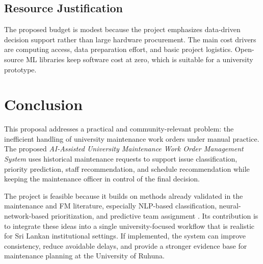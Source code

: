 \documentclass[11pt,a4paper]{report}
\begin{document}
\subsection{Resource Justification}
The proposed budget is modest because the project emphasizes data-driven decision support rather than large hardware procurement. The main cost drivers are computing access, data preparation effort, and basic project logistics. Open-source \ac{ML} libraries keep software cost at zero, which is suitable for a university prototype.

\section{Conclusion}
This proposal addresses a practical and community-relevant problem: the inefficient handling of university maintenance work orders under manual practice. The proposed \textit{AI-Assisted University Maintenance Work Order Management System} uses historical maintenance requests to support issue classification, priority prediction, staff recommendation, and schedule recommendation while keeping the maintenance officer in control of the final decision.

The project is feasible because it builds on methods already validated in the maintenance and \ac{FM} literature, especially \ac{NLP}-based classification, neural-network-based prioritization, and predictive team assignment \cite{bouabdallaoui2020,mo2020,dorazio2023,ensafi2024}. Its contribution is to integrate these ideas into a single university-focused workflow that is realistic for Sri Lankan institutional settings. If implemented, the system can improve consistency, reduce avoidable delays, and provide a stronger evidence base for maintenance planning at the University of Ruhuna.

\renewcommand{\bibname}{References}


\end{document}

